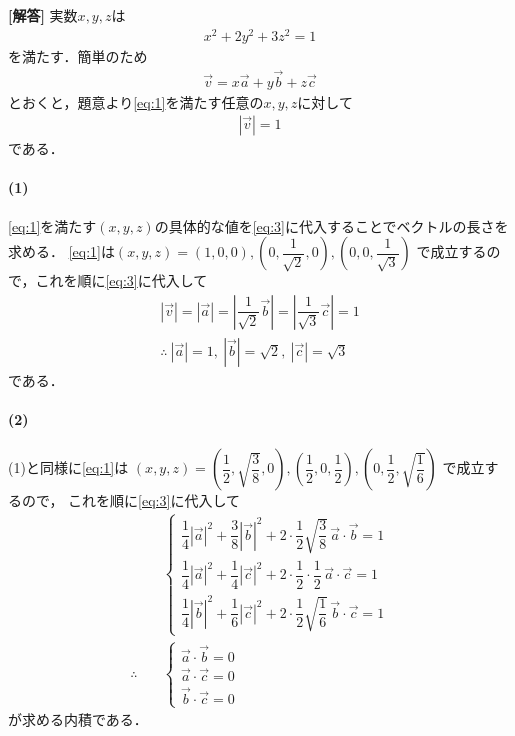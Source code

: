 \documentclass[../../main.tex]{subfiles}
\begin{document}
\begin{oframed}
  
\end{oframed}

{\bf [解答]}
実数$x,y,z$は
\begin{align}
  x^2+2y^2+3z^2=1 \label{eq:1}
\end{align}
を満たす．簡単のため
\begin{align}
  \vec{v}=x\vec{a}+y\vec{b}+z\vec{c} \label{eq:2}
\end{align}
とおくと，題意より\cref{eq:1}を満たす任意の$x,y,z$に対して
\begin{align}
  |\vec{v}| = 1 \label{eq:3}
\end{align}
である．

\paragraph{(1)}
\cref{eq:1}を満たす$(x,y,z)$の具体的な値を\cref{eq:3}に代入することでベクトルの長さを求める．
\cref{eq:1}は$(x,y,z)=(1,0,0),\left(0,\dfrac{1}{\sqrt{2}},0\right),\left(0,0,\dfrac{1}{\sqrt{3}}\right)$ で成立するので，これを順に\cref{eq:3}に代入して
\begin{align}
  |\vec{v}|=|\vec{a}|=\left|\dfrac{1}{\sqrt{2}}\vec{b}\right|=\left|\dfrac{1}{\sqrt{3}}\vec{c}\right|=1 \\
  \therefore\
  |\vec{a}|=1,\ |\vec{b}|=\sqrt{2},\ |\vec{c}|=\sqrt{3}
\end{align}
である．

\paragraph{(2)}
(1)と同様に\cref{eq:1}は $(x,y,z)=\left(\dfrac{1}{2},\sqrt{\dfrac{3}{8}},0\right),\left(\dfrac{1}{2},0,\dfrac{1}{2}\right),\left(0,\dfrac{1}{2},\sqrt{\dfrac{1}{6}}\right)$ で成立するので，
これを順に\cref{eq:3}に代入して
\begin{align}
  &
  \begin{cases}
    \dfrac{1}{4}|\vec{a}|^2+\dfrac{3}{8}|\vec{b}|^2+2\cdot\dfrac{1}{2}\sqrt{\dfrac{3}{8}}\,\vec{a}\cdot\vec{b}=1 \\
    \dfrac{1}{4}|\vec{a}|^2+\dfrac{1}{4}|\vec{c}|^2+2\cdot\dfrac{1}{2}\cdot\dfrac{1}{2}\,\vec a\cdot\vec c=1 \\
    \dfrac{1}{4}|\vec{b}|^2+\dfrac{1}{6}|\vec{c}|^2+2\cdot\dfrac{1}{2}\sqrt{\dfrac{1}{6}}\,\vec b\cdot\vec c=1
  \end{cases} \\
  \therefore\quad
  &
  \begin{cases}
    \vec{a}\cdot\vec{b}=0 \\
    \vec{a}\cdot\vec{c}=0 \\
    \vec{b}\cdot\vec{c}=0
  \end{cases}
\end{align}
が求める内積である．

\newpage
\end{document}

